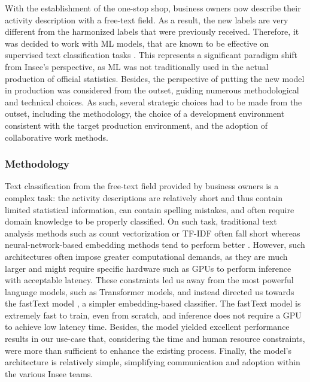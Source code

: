 \documentclass[graybox]{svmult}
\begin{document}
With the establishment of the one-stop shop, business owners now describe their activity description with a free-text field. As a result, the new labels are very different from the harmonized labels that were previously received. Therefore, it was decided to work with ML models, that are known to be effective on supervised text classification tasks \cite{li2022survey}. This represents a significant paradigm shift from Insee's perspective, as ML was not traditionally used in the actual production of official statistics. Besides, the perspective of putting the new model in production was considered from the outset, guiding numerous methodological and technical choices. As such, several strategic choices had to be made from the outset, including the methodology, the choice of a development environment consistent with the target production environment, and the adoption of collaborative work methods.

\subsubsection{Methodology}

Text classification from the free-text field provided by business owners is a complex task: the activity descriptions are relatively short and thus contain limited statistical information, can contain spelling mistakes, and often require domain knowledge to be properly classified. On such task, traditional text analysis methods such as count vectorization or TF-IDF often fall short whereas neural-network-based embedding methods tend to perform better \cite{li2022survey}. However, such architectures often impose greater computational demands, as they are much larger and might require specific hardware such as GPUs to perform inference with acceptable latency. These constraints led us away from the most powerful language models, such as Transformer models, and instead directed us towards the fastText model \cite{joulin2016bag}, a simpler embedding-based classifier. The fastText model is extremely fast to train, even from scratch, and inference does not require a GPU to achieve low latency time. Besides, the model yielded excellent performance results in our use-case that, considering the time and human resource constraints, were more than sufficient to enhance the existing process. Finally, the model's architecture is relatively simple, simplifying communication and adoption within the various Insee teams.
\end{document}
